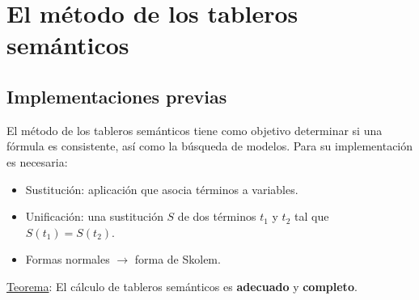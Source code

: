 \documentclass{beamer}
\begin{document}
\section{El método de los tableros semánticos}
\subsection{Implementaciones previas}
\begin{frame}
  El método de los tableros semánticos tiene como objetivo determinar si una fórmula es consistente, así como la búsqueda de modelos. Para su implementación es necesaria:
  \begin{itemize}
  \item Sustitución: aplicación que asocia términos a variables.
  \item Unificación: una sustitución $S$ de dos términos $t_1$ y $t_2$ tal que $S(t_1)=S(t_2)$. 
  \item Formas normales $\longrightarrow$ forma de Skolem.
  \end{itemize}
\underline{Teorema}: El cálculo de tableros semánticos es \textbf{adecuado} y \textbf{completo}.  
\end{frame}
\end{document}
